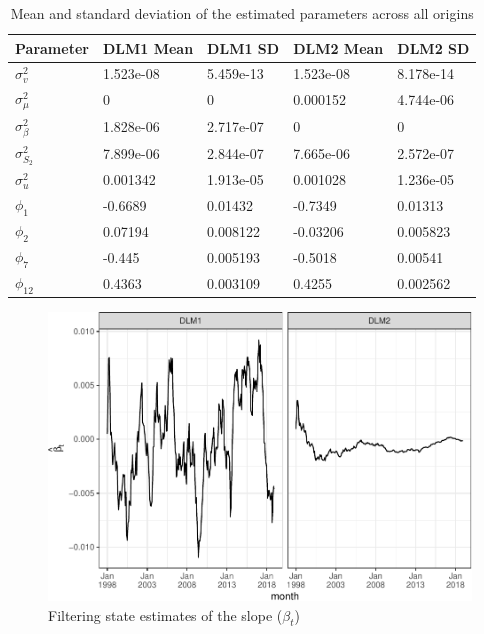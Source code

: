 \documentclass[12pt, a4paper]{article}
\begin{document}
\begin{table}[H]

\caption{\label{tab:par-comparison}Mean and standard deviation of the estimated parameters across all origins}
\centering
\begin{tabular}{lllll}
\toprule
Parameter & DLM1 Mean & DLM1 SD & DLM2 Mean & DLM2 SD\\
\midrule
$\sigma_{v}^{2}$ & 1.523e-08 & 5.459e-13 & 1.523e-08 & 8.178e-14\\
$\sigma_{\mu}^{2}$ & 0 & 0 & 0.000152 & 4.744e-06\\
$\sigma_{\beta}^{2}$ & 1.828e-06 & 2.717e-07 & 0 & 0\\
$\sigma_{S_{2}}^{2}$ & 7.899e-06 & 2.844e-07 & 7.665e-06 & 2.572e-07\\
$\sigma^{2}_{u}$ & 0.001342 & 1.913e-05 & 0.001028 & 1.236e-05\\
\addlinespace
$\phi_{1}$ & -0.6689 & 0.01432 & -0.7349 & 0.01313\\
$\phi_{2}$ & 0.07194 & 0.008122 & -0.03206 & 0.005823\\
$\phi_{7}$ & -0.445 & 0.005193 & -0.5018 & 0.00541\\
$\phi_{12}$ & 0.4363 & 0.003109 & 0.4255 & 0.002562\\
\bottomrule
\end{tabular}
\end{table}

\begin{figure}[H]
  \caption{\label{fig:trend-growth}Filtering state estimates of the slope
($\beta_t$)}
\centering
\includegraphics[scale = 0.8]{../figs/freq--trend-growth-1.pdf}
\end{figure}
\end{document}
